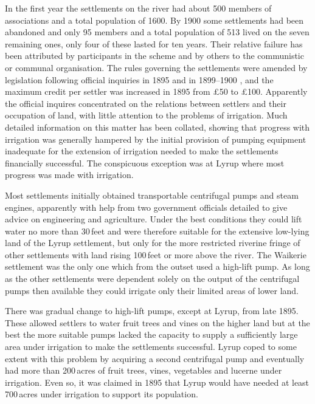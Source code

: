 In the first year the settlements on the river had about 500 members
of associations and a total population of 1600.  By 1900 some
settlements had been abandoned and only 95 members and a total
population of 513 lived on the seven remaining ones, only four of
these lasted for ten years.  Their relative failure has been
attributed by participants in the scheme and by others to the
communistic or communal organisation.  The rules governing the
settlements were amended by legislation following official inquiries
in 1895 and in 1899--1900 , and the maximum credit per settler was
increased in 1895 from \pounds50 to \pounds100.  Apparently the
official inquires concentrated on the relations between settlers and
their occupation of land, with little attention to the problems of
irrigation.  Much detailed information on this matter has been
collated, showing that progress with irrigation was generally hampered
by the initial provision of pumping
equipment inadequate for the extension of irrigation needed to make
the settlements financially successful.  The
conspicuous exception was at Lyrup where most progress was made with
irrigation.

Most settlements initially obtained transportable centrifugal pumps
 and steam engines,
apparently with help from two government officials detailed to give
advice on engineering and agriculture.  Under the best conditions they
could lift water no more than 30\,feet and were therefore suitable for
the extensive low-lying land of the Lyrup settlement,
but only for the more restricted riverine fringe of other settlements
with land rising 100\,feet or more above the river.  The Waikerie
 settlement was the only one which from the outset
used a high-lift pump. 
As long as the other settlements were dependent solely on the output
of the centrifugal pumps then available they could irrigate only their
limited areas of lower land.

There was gradual change to high-lift pumps, except at Lyrup, from
late 1895.  These allowed settlers to water fruit trees
and vines on the higher land but at the best the more
suitable pumps lacked the capacity to supply a sufficiently large area
under irrigation to make the settlements successful.  Lyrup coped to
some extent with this problem by acquiring a second centrifugal pump
 and eventually had more
than 200\,acres of fruit trees, vines, vegetables
and lucerne under irrigation.  Even so, it was claimed
in 1895 that Lyrup would have needed at least 700\,acres under
irrigation to support its population.


